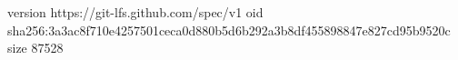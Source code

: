version https://git-lfs.github.com/spec/v1
oid sha256:3a3ac8f710e4257501ceca0d880b5d6b292a3b8df455898847e827cd95b9520c
size 87528
